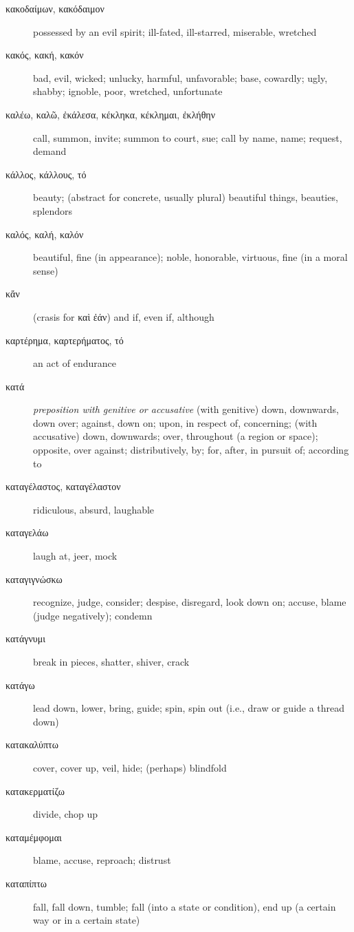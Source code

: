 \documentclass[12pt,letterpaper]{article}
\begin{document}
\begin{description}
    \item[\textgreek{κακοδαίμων, κακόδαιμον}] possessed by an evil spirit; ill-fated, ill-starred, miserable, wretched
    \item[\textgreek{κακός, κακή, κακόν}] \marginnote{*}bad, evil, wicked; unlucky, harmful, unfavorable; base, cowardly; ugly, shabby; ignoble, poor, wretched, unfortunate
    \item[\textgreek{καλέω, καλῶ, ἐκάλεσα, κέκληκα, κέκλημαι, ἐκλήθην}] \marginnote{*}call, summon, invite; summon to court, sue; call by name, name; request, demand
    \item[\textgreek{κάλλος, κάλλους, τό}] beauty; (abstract for concrete, usually plural) beautiful things, beauties, splendors
    \item[\textgreek{καλός, καλή, καλόν}] \marginnote{*}beautiful, fine (in appearance); noble, honorable, virtuous, fine (in a moral sense)
    \item[\textgreek{κἄν}] \marginnote{*}(crasis for \textgreek{καὶ ἐάν}) and if, even if, although
    \item[\textgreek{καρτέρημα, καρτερήματος, τό}] an act of endurance
    \item[\textgreek{κατά}] \marginnote{*}\textit{preposition with genitive or accusative} (with genitive) down, downwards, down over; against, down on; upon, in respect of, concerning; (with accusative) down, downwards; over, throughout (a region or space); opposite, over against; distributively, by; for, after, in pursuit of; according to
    \item[\textgreek{καταγέλαστος, καταγέλαστον}] ridiculous, absurd, laughable
    \item[\textgreek{καταγελάω}] laugh at, jeer, mock
    \item[\textgreek{καταγιγνώσκω}] recognize, judge, consider; despise, disregard, look down on; accuse, blame (judge negatively); condemn
    \item[\textgreek{κατάγνυμι}] break in pieces, shatter, shiver, crack
    \item[\textgreek{κατάγω}] lead down, lower, bring, guide; spin, spin out (i.e., draw or guide a thread down)
    \item[\textgreek{κατακαλύπτω}] cover, cover up, veil, hide; (perhaps) blindfold
    \item[\textgreek{κατακερματίζω}] divide, chop up
    \item[\textgreek{καταμέμφομαι}] blame, accuse, reproach; distrust
    \item[\textgreek{καταπίπτω}] fall, fall down, tumble; fall (into a state or condition), end up (a certain way or in a certain state)

\end{description}
\end{document}
